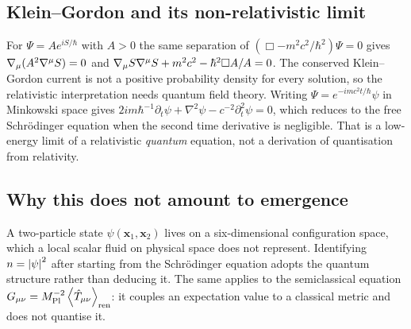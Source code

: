 \subsection{Klein--Gordon and its non-relativistic limit}\label{app:quantum-kg}

For $\Psi=Ae^{iS/\hbar}$ with $A>0$ the same separation of
$(\Box-m^2c^2/\hbar^2)\Psi=0$ gives
$\nabla_\mu(A^2\nabla^\mu S)=0$ and
$\nabla_\mu S\nabla^\mu S+m^2c^2-\hbar^2\Box A/A=0$. The conserved
Klein--Gordon current is not a positive probability density for every solution,
so the relativistic interpretation needs quantum field theory. Writing
$\Psi=e^{-imc^2t/\hbar}\psi$ in Minkowski space gives
$2im\hbar^{-1}\partial_t\psi+\nabla^2\psi-c^{-2}\partial_t^2\psi=0$, which
reduces to the free Schr\"odinger equation when the second time derivative is
negligible. That is a low-energy limit of a relativistic \emph{quantum}
equation, not a derivation of quantisation from relativity.

\subsection{Why this does not amount to emergence}\label{app:quantum-limits}

A two-particle state $\psi(\mathbf x_1,\mathbf x_2)$ lives on a six-dimensional
configuration space, which a local scalar fluid on physical space does not
represent. Identifying $n=\left|\psi\right|^2$ after starting from the Schr\"odinger
equation adopts the quantum structure rather than deducing it. The same
applies to the semiclassical equation
$G_{\mu\nu}=M_{\mathrm{Pl}}^{-2}\left\langle \hat T_{\mu\nu} \right\rangle_{\rm ren}$: it couples an expectation value
to a classical metric and does not quantise it.
